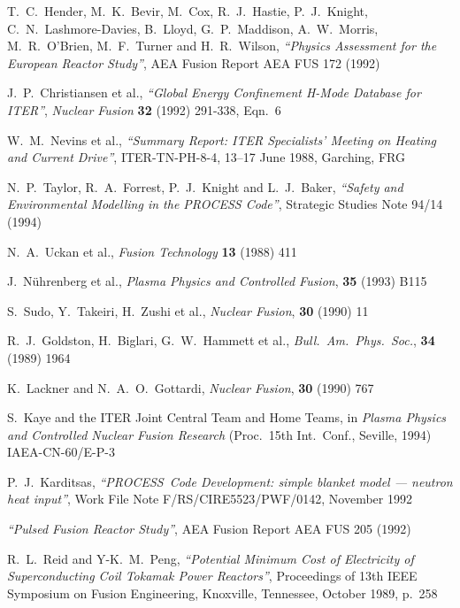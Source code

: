 \documentclass[11pt,a4paper]{report}
\newcommand{\PS}{\mbox{\it PROCESS\/ }}
\begin{document}
\begin{thebibliography}{99}
T.\ C.\ Hender, M.\ K.\ Bevir, M.\ Cox, R.\ J.\ Hastie, P.\ J.\
Knight, C.\ N.\ Lashmore-Davies, B.\ Lloyd, G.\ P.\ Maddison, A.\ W.\
Morris, M.\ R.\ O'Brien, M.\ F.\ Turner and H.\ R.\ Wilson,
{\it ``Physics Assessment for the European Reactor Study''},
AEA Fusion Report AEA FUS 172
(1992)

J.\ P.\ Christiansen et al.,
{\it ``Global Energy Confinement H-Mode Database for ITER''},
{\it Nuclear Fusion} {\bf 32} (1992) 291-338, Eqn.\ 6

W.\ M.\ Nevins et al.,
{\it ``Summary Report: ITER Specialists' Meeting on Heating and
Current Drive''},
ITER-TN-PH-8-4,
13--17 June 1988, Garching, FRG

N.\ P.\ Taylor, R.\ A.\ Forrest, P.\ J.\ Knight and L.\ J.\ Baker,
{\it ``Safety and Environmental Modelling in the PROCESS Code''},
Strategic Studies Note 94/14
(1994)

N.\ A.\ Uckan et al.,
{\it Fusion Technology} {\bf 13} (1988) 411

J.\ N\"{u}hrenberg et al., {\it Plasma Physics and Controlled Fusion}, {\bf
35} (1993) B115

S.\ Sudo, Y.\ Takeiri, H.\ Zushi et al., {\it Nuclear Fusion}, {\bf 30} (1990)
11

R.\ J.\ Goldston, H.\ Biglari, G.\ W.\ Hammett et al., {\it Bull.\ Am.\ Phys.\
Soc.}, {\bf 34} (1989) 1964

\bibitem{LG}
K.\ Lackner and N.\ A.\ O.\ Gottardi, {\it Nuclear Fusion}, {\bf 30} (1990)
767

\bibitem{iter93h}
S.\ Kaye and the ITER Joint Central Team and Home Teams, in {\it Plasma
Physics and Controlled Nuclear Fusion Research} (Proc.\ 15th Int.\ Conf.,
Seville, 1994) IAEA-CN-60/E-P-3

\bibitem{Panos}
P.\ J.\ Karditsas, {\it ``\PS Code Development: simple blanket model ---
neutron heat input''},
Work File Note F/RS/CIRE5523/PWF/0142, November 1992

\bibitem{ELECTROWATT}
{\it ``Pulsed Fusion Reactor Study''},
AEA Fusion Report AEA FUS 205
(1992)

R.\ L.\ Reid and Y-K.\ M.\ Peng,
{\it ``Potential Minimum Cost of Electricity of Superconducting Coil
Tokamak Power Reactors''},
Proceedings of 13th IEEE Symposium on Fusion Engineering, Knoxville,
Tennessee, October 1989, p.\ 258


\end{thebibliography}
\end{document}
